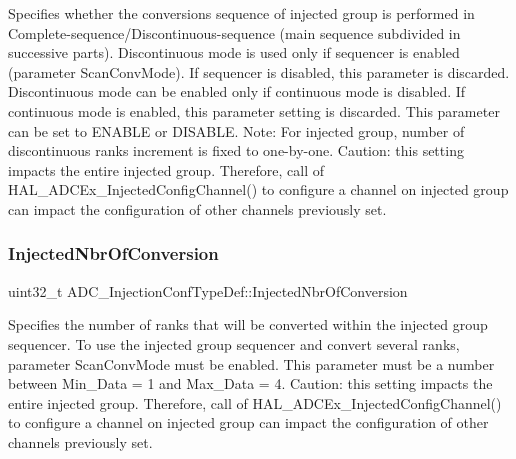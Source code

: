 Specifies whether the conversions sequence of injected group is performed in Complete-\/sequence/\+Discontinuous-\/sequence (main sequence subdivided in successive parts). Discontinuous mode is used only if sequencer is enabled (parameter \textquotesingle{}Scan\+Conv\+Mode\textquotesingle{}). If sequencer is disabled, this parameter is discarded. Discontinuous mode can be enabled only if continuous mode is disabled. If continuous mode is enabled, this parameter setting is discarded. This parameter can be set to E\+N\+A\+B\+LE or D\+I\+S\+A\+B\+LE. Note\+: For injected group, number of discontinuous ranks increment is fixed to one-\/by-\/one. Caution\+: this setting impacts the entire injected group. Therefore, call of H\+A\+L\+\_\+\+A\+D\+C\+Ex\+\_\+\+Injected\+Config\+Channel() to configure a channel on injected group can impact the configuration of other channels previously set. \mbox{\label{struct_a_d_c___injection_conf_type_def_ac59f9795b1b8c4ce6745d99f8231b768}} 
\subsubsection{\texorpdfstring{InjectedNbrOfConversion}{InjectedNbrOfConversion}}
{\footnotesize\ttfamily uint32\+\_\+t A\+D\+C\+\_\+\+Injection\+Conf\+Type\+Def\+::\+Injected\+Nbr\+Of\+Conversion}

Specifies the number of ranks that will be converted within the injected group sequencer. To use the injected group sequencer and convert several ranks, parameter \textquotesingle{}Scan\+Conv\+Mode\textquotesingle{} must be enabled. This parameter must be a number between Min\+\_\+\+Data = 1 and Max\+\_\+\+Data = 4. Caution\+: this setting impacts the entire injected group. Therefore, call of H\+A\+L\+\_\+\+A\+D\+C\+Ex\+\_\+\+Injected\+Config\+Channel() to configure a channel on injected group can impact the configuration of other channels previously set. \mbox{\label{struct_a_d_c___injection_conf_type_def_ac7d28d71ec3aec4d1587ee04fc585f09}} 
